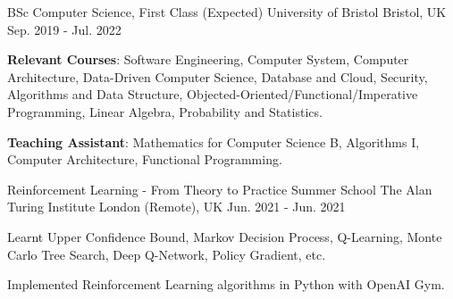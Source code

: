 

\begin{cventries}

  \cventry
    {BSc Computer Science, First Class (Expected)} %
    {University of Bristol} %
    {Bristol, UK} %
    {Sep. 2019 - Jul. 2022} %
    {
      \begin{cvitems} %
        \item {\textbf{Relevant Courses}: Software Engineering, Computer System, Computer Architecture, Data-Driven Computer Science, Database and Cloud, Security, Algorithms and Data Structure, Objected-Oriented/Functional/Imperative Programming, Linear Algebra, Probability and Statistics.}
        \item {\textbf{Teaching Assistant}: Mathematics for Computer Science B, Algorithms I, Computer Architecture, Functional Programming.}
      \end{cvitems}
    }
    
  \cventry
    {Reinforcement Learning - From Theory to Practice Summer School} %
    {The Alan Turing Institute} %
    {London (Remote), UK} %
    {Jun. 2021 - Jun. 2021} %
    {
      \begin{cvitems} %
        \item {Learnt Upper Confidence Bound, Markov Decision Process, Q-Learning, Monte Carlo Tree Search, Deep Q-Network, Policy Gradient, etc.}
        \item {Implemented Reinforcement Learning algorithms in Python with OpenAI Gym.}
      \end{cvitems}
    }

\end{cventries}
